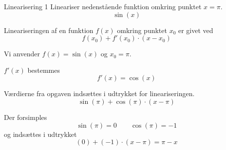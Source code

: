 \documentclass{article}
\begin{document}
\tableofcontents
\newpage


\begin{exercise}{Linearisering 1}
Lineariser nedenstående funktion omkring punktet $x = \pi$.
\[
\sin(x)
\]


\hint
Lineariseringen af en funktion $f(x)$
omkring punktet $x_0$ er givet ved
\[
f(x_0) + f'(x_0) \cdot (x - x_0)
\]

\hint
Vi anvender $f(x) = \sin(x)$ og $x_0 = \pi$.

\hint
$f'(x)$ bestemmes
\[
f'(x) = \cos(x)
\]

\hint
Værdierne fra opgaven indsættes i udtrykket for lineariseringen.
\[
\sin(\pi) + \cos(\pi) \cdot (x - \pi)
\]

\hint
Der forsimples
\[
\sin(\pi) = 0 \qquad
\cos(\pi) = -1
\]
og indsættes i udtrykket
\[
(0) + (-1) \cdot (x - \pi) =
\pi - x
\]

\end{exercise}
\end{document}
